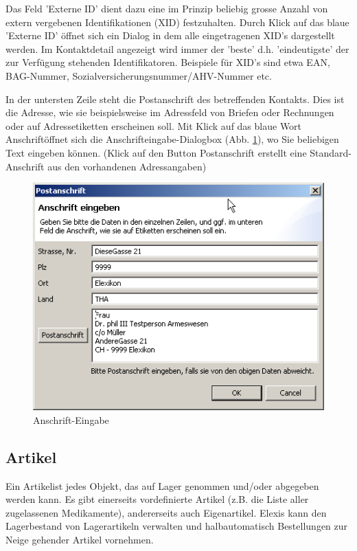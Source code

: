 \medskip

Das Feld 'Externe ID' dient dazu eine im Prinzip beliebig grosse Anzahl von extern vergebenen Identifikationen (XID) festzuhalten. Durch Klick auf das blaue 'Externe ID' öffnet sich ein Dialog in dem alle eingetragenen XID's dargestellt werden. Im Kontaktdetail angezeigt wird immer der 'beste' d.h. 'eindeutigste' der zur Verfügung stehenden Identifikatoren. Beispiele für XID's sind etwa EAN, BAG-Nummer, Sozialversicherungsnummer/AHV-Nummer etc.

\medskip

In der untersten Zeile steht die Postanschrift des betreffenden Kontakts. Dies
ist die Adresse, wie sie beispielsweise im Adressfeld von Briefen oder
Rechnungen oder auf Adressetiketten erscheinen soll. Mit Klick auf das blaue
Wort \glqq Anschrift\grqq{}öffnet sich die Anschrifteingabe-Dialogbox (Abb.
\ref{fig:anschrift}), wo Sie beliebigen Text eingeben können. (Klick auf den
Button \glqq Postanschrift\grqq{} erstellt eine Standard-Anschrift aus den
vorhandenen Adressangaben)


\begin{figure}[htp]
\begin{center}
  \includegraphics{images/anschrifteingabe}
  \caption{Anschrift-Eingabe}
  \label{fig:anschrift}
\end{center}
\end{figure}
\bigskip
\pagebreak[3]
\subsection{Artikel}
\label{view:artikel}
Ein \glqq Artikel\grqq{}ist jedes Objekt, das auf Lager genommen und/oder
abgegeben werden kann. Es gibt einerseits vordefinierte Artikel (z.B. die Liste
aller zugelassenen Medikamente), andererseits auch Eigenartikel. Elexis kann den
Lagerbestand von Lagerartikeln verwalten und halbautomatisch Bestellungen zur Neige
gehender Artikel vornehmen.


